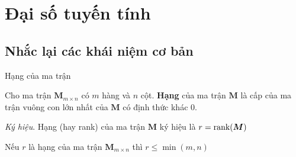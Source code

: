 \chapter{Đại số tuyến tính}

\section{Nhắc lại các khái niệm cơ bản}

\begin{defblock}{Hạng của ma trận}
    
    Cho ma trận $\bm{M}_{m \times n}$ có $m$ hàng và $n$ cột. \textbf{Hạng} của ma trận $\bm{M}$ là cấp của ma trận vuông con lớn nhất của $\bm{M}$ có định thức khác 0.

    \textit{Ký hiệu}. Hạng (hay rank) của ma trận $\bm{M}$ ký hiệu là $r = \text{rank}(\bm{M})$

    \end{defblock}

\begin{remark}
    Nếu $r$ là hạng của ma trận $\bm{M}_{m \times n}$ thì $r \leq \min (m, n)$
\end{remark}
\newpage